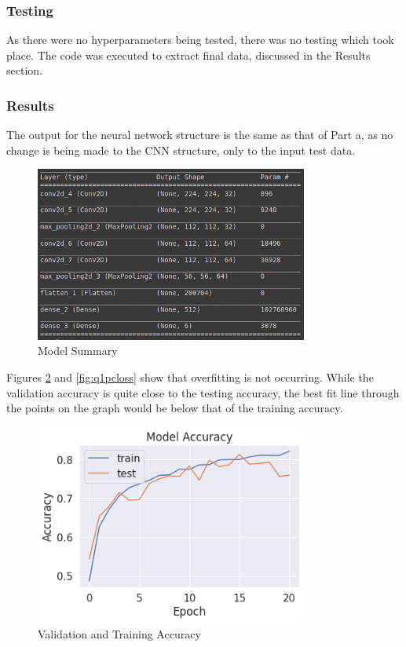 \subsubsection{Testing}

As there were no hyperparameters being tested, there was no testing which took
place. The code was executed to extract final data, discussed in the Results
section.

\subsubsection{Results}

The output for the neural network structure is the same as that of Part a, as no
change is being made to the CNN structure, only to the input test data.

\begin{figure}[H]
	\centering
	\includegraphics[width=0.8\textwidth]{images/q1/pc/q1pcmodel}
	\caption{Model Summary}
	\label{fig:q1pcmodel}
\end{figure}

Figures \ref{fig:q1pcacc} and \ref{fig:q1pcloss} show that overfitting is not
occurring. While the validation accuracy is quite close to the testing accuracy,
the best fit line through the points on the graph would be below that of the
training accuracy.

\begin{figure}[H]
	\centering
	\includegraphics[width=0.8\textwidth]{images/q1/pc/accuracy}
	\caption{Validation and Training Accuracy}
	\label{fig:q1pcacc}
\end{figure}

